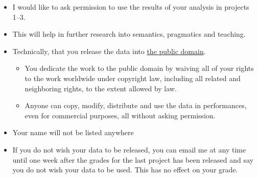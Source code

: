 \documentclass[a4paper,landscape,headrule,footrule,xetex]{foils}
\begin{document}

\begin{itemize}
\item I would like to ask permission to use the results of your
  analysis in projects 1--3.
\item This will help in further research into semantics, pragmatics
  and teaching.
\item Technically, that you release the data into \href{https://creativecommons.org/publicdomain/zero/1.0/}{the public domain}.
  \begin{itemize}
  \item You dedicate the work to the public domain by waiving all of
    your rights to the work worldwide under copyright law, including
    all related and neighboring rights, to the extent allowed by law.
  \item Anyone can copy, modify, distribute and use the data in
    performances, even for commercial purposes, all without asking
    permission.
  \end{itemize}
\item Your name will not be listed anywhere
\item If you do not wish your data to be released, you can email me at
  any time until one week after the grades for the last project has
  been released and say you do not wish your data to be used.  This
  has no effect on your grade.
\end{itemize}






\small


\end{document}
